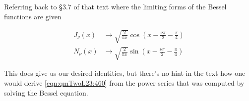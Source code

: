 Referring back to \S 3.7 of that text where the limiting forms of the Bessel functions are given

\begin{align}\label{eqn:qmTwoL23:460}
J_\nu(x) &\rightarrow \sqrt{\frac{2}{\pi x}} \cos\left(x - \frac{\nu\pi}{2} - \frac{\pi}{4} \right) \\
N_\nu(x) &\rightarrow \sqrt{\frac{2}{\pi x}} \sin\left(x - \frac{\nu\pi}{2} - \frac{\pi}{4} \right)
\end{align}

This does give us our desired identities, but there's no hint in the text how one would derive \ref{eqn:qmTwoL23:460} from the power series that was computed by solving the Bessel equation.

\EndArticle
